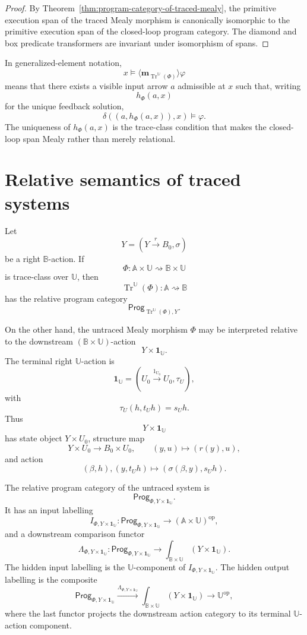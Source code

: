 \begin{proof}
By Theorem~\ref{thm:program-category-of-traced-mealy}, the primitive execution
span of the traced Mealy morphism is canonically isomorphic to the primitive
execution span of the closed-loop program category.  The diamond and box
predicate transformers are invariant under isomorphism of spans.
\end{proof}

\begin{remark}
\label{rem:operational-reading-feedback-closure}
In generalized-element notation,
\[
x\models
\langle
\mathbf m_{\operatorname{Tr}^{\mathbb U}(\Phi)}
\rangle\varphi
\]
means that there exists a visible input arrow \(a\) admissible at \(x\) such
that, writing
\[
h_\Phi(a,x)
\]
for the unique feedback solution,
\[
\delta((a,h_\Phi(a,x)),x)\models\varphi.
\]
The uniqueness of \(h_\Phi(a,x)\) is the trace-class condition that makes the
closed-loop span Mealy rather than merely relational.
\end{remark}

\section{Relative semantics of traced systems}
\label{sec:relative-semantics-traced-systems}

Let
\[
Y=(Y\xrightarrow{r}B_0,\sigma)
\]
be a right \(\mathbb B\)-action.  If
\[
\Phi:
\mathbb A\times\mathbb U
\rightsquigarrow
\mathbb B\times\mathbb U
\]
is trace-class over \(\mathbb U\), then
\[
\operatorname{Tr}^{\mathbb U}(\Phi):
\mathbb A\rightsquigarrow\mathbb B
\]
has the relative program category
\[
\mathsf{Prog}_{\operatorname{Tr}^{\mathbb U}(\Phi),Y}.
\]

On the other hand, the untraced Mealy morphism \(\Phi\) may be interpreted
relative to the downstream \((\mathbb B\times\mathbb U)\)-action
\[
Y\times\mathbf 1_{\mathbb U}.
\]
The terminal right \(\mathbb U\)-action is
\[
\mathbf 1_{\mathbb U}
=
(U_0\xrightarrow{1_{U_0}}U_0,\tau_U),
\]
with
\[
\tau_U(h,t_Uh)=s_Uh.
\]
Thus
\[
Y\times\mathbf 1_{\mathbb U}
\]
has state object \(Y\times U_0\), structure map
\[
Y\times U_0\to B_0\times U_0,
\qquad
(y,u)\longmapsto(r(y),u),
\]
and action
\[
(\beta,h),(y,t_Uh)
\longmapsto
(\sigma(\beta,y),s_Uh).
\]

The relative program category of the untraced system is
\[
\mathsf{Prog}_{\Phi,Y\times\mathbf 1_{\mathbb U}}.
\]
It has an input labelling
\[
I_{\Phi,Y\times\mathbf 1_{\mathbb U}}:
\mathsf{Prog}_{\Phi,Y\times\mathbf 1_{\mathbb U}}
\to
(\mathbb A\times\mathbb U)^{\mathrm{op}},
\]
and a downstream comparison functor
\[
\Lambda_{\Phi,Y\times\mathbf 1_{\mathbb U}}:
\mathsf{Prog}_{\Phi,Y\times\mathbf 1_{\mathbb U}}
\to
\int_{\mathbb B\times\mathbb U}(Y\times\mathbf 1_{\mathbb U}).
\]
The hidden input labelling is the \(\mathbb U\)-component of
\(I_{\Phi,Y\times\mathbf 1_{\mathbb U}}\).  The hidden output labelling is the
composite
\[
\mathsf{Prog}_{\Phi,Y\times\mathbf 1_{\mathbb U}}
\xrightarrow{\Lambda_{\Phi,Y\times\mathbf 1_{\mathbb U}}}
\int_{\mathbb B\times\mathbb U}(Y\times\mathbf 1_{\mathbb U})
\longrightarrow
\mathbb U^{\mathrm{op}},
\]
where the last functor projects the downstream action category to its terminal
\(\mathbb U\)-action component.

